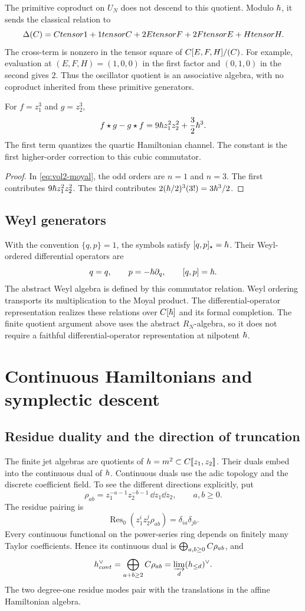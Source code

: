 The primitive coproduct on $U_N$ does not descend to this quotient.
Modulo $\hbar$, it sends the classical relation to
\[
 \Delta(C)=Ctensor1+1tensor C
   +2Etensor F+2Ftensor E+Htensor H.
\]
The cross-term is nonzero in the tensor square of $C[E,F,H]/(C)$.
For example, evaluation at $(E,F,H)=(1,0,0)$ in the first factor
and $(0,1,0)$ in the second gives $2$.
Thus the oscillator quotient is an associative algebra, with no coproduct inherited from these primitive generators.

\begin{calculation}
For $f=z_1^3$ and $g=z_2^3$,
\[
 f\star g-g\star f
 =9\hbar z_1^2z_2^2+\frac32\hbar^3.
\]
The first term quantizes the quartic Hamiltonian channel.  The constant
is the first higher-order correction to this cubic commutator.
\end{calculation}
\begin{proof}
In \eqref{eq:vol2-moyal}, the odd orders are $n=1$ and $n=3$.  The first contributes $9\hbar z_1^2z_2^2$.  The third contributes $2(\hbar/2)^3(3!)=3\hbar^3/2$.
\end{proof}

\section{Weyl generators}
With the convention $\{q,p\}=1$, the symbols satisfy
$[q,p]_\star=\hbar$.
Their Weyl-ordered differential operators are
\[
 q=q,\qquad p=-\hbar\partial_q,
 \qquad [q,p]=\hbar.
\]
The abstract Weyl algebra is defined by this commutator relation.
Weyl ordering transports its multiplication to the Moyal product.
The differential-operator representation realizes these relations over
$C[\hbar]$ and its formal completion.
The finite quotient argument above uses the abstract $R_N$-algebra,
so it does not require a faithful differential-operator representation at nilpotent $\hbar$.

\chapter{Continuous Hamiltonians and symplectic descent}
\section{Residue duality and the direction of truncation}
The finite jet algebras are quotients of
$h=m^2\subset C\llbracket z_1,z_2\rrbracket$.
Their duals embed into the continuous dual of $h$.
Continuous duals use the adic topology and the discrete coefficient field.
To see the different directions explicitly, put
\[
 \rho_{ab}=z_1^{-a-1}z_2^{-b-1}\,\dd z_1\dd z_2,
 \qquad a,b\ge0.
\]
The residue pairing is
\[
 \operatorname{Res}_0(z_1^iz_2^j\rho_{ab})
 =\delta_{ia}\delta_{jb}.
\]
Every continuous functional on the power-series ring depends on
finitely many Taylor coefficients.  Hence its continuous dual is
$\bigoplus_{a,b\ge0}C\rho_{ab}$, and
\[
 h^\vee_{cont}
 =\bigoplus_{a+b\ge2}C\rho_{ab}
 =\varinjlim_d(h_{\le d})^\vee.
\]
The two degree-one residue modes pair with the translations in the
affine Hamiltonian algebra.

